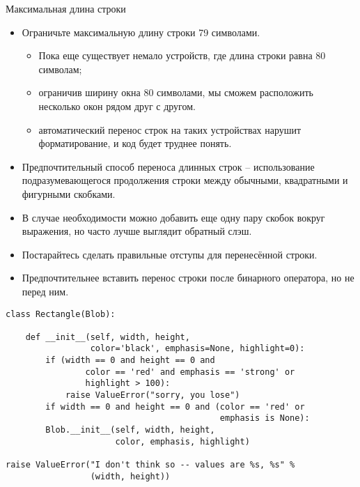 \documentclass[xcolor=table]{beamer}
\begin{document}
\begin{frame}{Максимальная длина строки}
	\begin{itemize}
		\item Ограничьте максимальную длину строки 79 символами.
		\begin{itemize}		
			\item Пока еще существует немало устройств, где длина строки равна 80 символам; 
			\item ограничив ширину окна 80 символами, мы сможем расположить несколько окон рядом друг с другом. 
			\item автоматический перенос строк на таких устройствах нарушит форматирование, и код будет труднее понять. 
		\end{itemize}		
		\item Предпочтительный способ переноса длинных строк -- использование подразумевающегося продолжения строки между обычными, квадратными и фигурными скобками. 
		\item В случае необходимости можно добавить еще одну пару скобок вокруг выражения, но часто лучше выглядит обратный слэш. 
			\item Постарайтесь сделать правильные отступы для перенесённой строки.
			\item Предпочтительнее вставить перенос строки после бинарного оператора, но не перед ним.
	\end{itemize}
\end{frame}

\begin{frame}
	\begin{verbatim}
class Rectangle(Blob):

    def __init__(self, width, height,
                 color='black', emphasis=None, highlight=0):
        if (width == 0 and height == 0 and
                color == 'red' and emphasis == 'strong' or
                highlight > 100):
            raise ValueError("sorry, you lose")
        if width == 0 and height == 0 and (color == 'red' or
                                           emphasis is None):
        Blob.__init__(self, width, height,
                      color, emphasis, highlight) 
                      
raise ValueError("I don't think so -- values are %s, %s" %
                 (width, height))                      
	\end{verbatim}
\end{frame}
\end{document}
